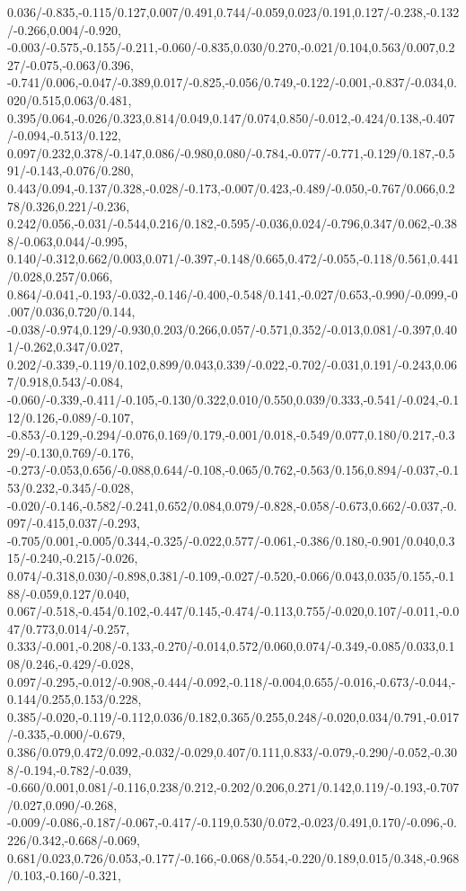 {0.036/-0.835,-0.115/0.127,0.007/0.491,0.744/-0.059,0.023/0.191,0.127/-0.238,-0.132/-0.266,0.004/-0.920,%
-0.003/-0.575,-0.155/-0.211,-0.060/-0.835,0.030/0.270,-0.021/0.104,0.563/0.007,0.227/-0.075,-0.063/0.396,%
-0.741/0.006,-0.047/-0.389,0.017/-0.825,-0.056/0.749,-0.122/-0.001,-0.837/-0.034,0.020/0.515,0.063/0.481,%
0.395/0.064,-0.026/0.323,0.814/0.049,0.147/0.074,0.850/-0.012,-0.424/0.138,-0.407/-0.094,-0.513/0.122,%
0.097/0.232,0.378/-0.147,0.086/-0.980,0.080/-0.784,-0.077/-0.771,-0.129/0.187,-0.591/-0.143,-0.076/0.280,%
0.443/0.094,-0.137/0.328,-0.028/-0.173,-0.007/0.423,-0.489/-0.050,-0.767/0.066,0.278/0.326,0.221/-0.236,%
0.242/0.056,-0.031/-0.544,0.216/0.182,-0.595/-0.036,0.024/-0.796,0.347/0.062,-0.388/-0.063,0.044/-0.995,%
0.140/-0.312,0.662/0.003,0.071/-0.397,-0.148/0.665,0.472/-0.055,-0.118/0.561,0.441/0.028,0.257/0.066,%
0.864/-0.041,-0.193/-0.032,-0.146/-0.400,-0.548/0.141,-0.027/0.653,-0.990/-0.099,-0.007/0.036,0.720/0.144,%
-0.038/-0.974,0.129/-0.930,0.203/0.266,0.057/-0.571,0.352/-0.013,0.081/-0.397,0.401/-0.262,0.347/0.027,%
0.202/-0.339,-0.119/0.102,0.899/0.043,0.339/-0.022,-0.702/-0.031,0.191/-0.243,0.067/0.918,0.543/-0.084,%
-0.060/-0.339,-0.411/-0.105,-0.130/0.322,0.010/0.550,0.039/0.333,-0.541/-0.024,-0.112/0.126,-0.089/-0.107,%
-0.853/-0.129,-0.294/-0.076,0.169/0.179,-0.001/0.018,-0.549/0.077,0.180/0.217,-0.329/-0.130,0.769/-0.176,%
-0.273/-0.053,0.656/-0.088,0.644/-0.108,-0.065/0.762,-0.563/0.156,0.894/-0.037,-0.153/0.232,-0.345/-0.028,%
-0.020/-0.146,-0.582/-0.241,0.652/0.084,0.079/-0.828,-0.058/-0.673,0.662/-0.037,-0.097/-0.415,0.037/-0.293,%
-0.705/0.001,-0.005/0.344,-0.325/-0.022,0.577/-0.061,-0.386/0.180,-0.901/0.040,0.315/-0.240,-0.215/-0.026,%
0.074/-0.318,0.030/-0.898,0.381/-0.109,-0.027/-0.520,-0.066/0.043,0.035/0.155,-0.188/-0.059,0.127/0.040,%
0.067/-0.518,-0.454/0.102,-0.447/0.145,-0.474/-0.113,0.755/-0.020,0.107/-0.011,-0.047/0.773,0.014/-0.257,%
0.333/-0.001,-0.208/-0.133,-0.270/-0.014,0.572/0.060,0.074/-0.349,-0.085/0.033,0.108/0.246,-0.429/-0.028,%
0.097/-0.295,-0.012/-0.908,-0.444/-0.092,-0.118/-0.004,0.655/-0.016,-0.673/-0.044,-0.144/0.255,0.153/0.228,%
0.385/-0.020,-0.119/-0.112,0.036/0.182,0.365/0.255,0.248/-0.020,0.034/0.791,-0.017/-0.335,-0.000/-0.679,%
0.386/0.079,0.472/0.092,-0.032/-0.029,0.407/0.111,0.833/-0.079,-0.290/-0.052,-0.308/-0.194,-0.782/-0.039,%
-0.660/0.001,0.081/-0.116,0.238/0.212,-0.202/0.206,0.271/0.142,0.119/-0.193,-0.707/0.027,0.090/-0.268,%
-0.009/-0.086,-0.187/-0.067,-0.417/-0.119,0.530/0.072,-0.023/0.491,0.170/-0.096,-0.226/0.342,-0.668/-0.069,%
0.681/0.023,0.726/0.053,-0.177/-0.166,-0.068/0.554,-0.220/0.189,0.015/0.348,-0.968/0.103,-0.160/-0.321,%
}
